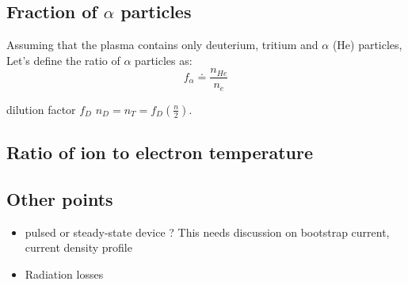 \subsection{Fraction of $\alpha$ particles}
Assuming that the plasma contains only deuterium, tritium and $\alpha$ (He) particles, 
Let's define the ratio of $\alpha$ particles as:
\begin{equation}
f_\alpha
\doteq
\frac{n_{He}}{n_e}
\end{equation}

dilution factor $f_D$ $n_D = n_T = f_D \left( \frac{n}{2} \right)$. 


\subsection{Ratio of ion to electron temperature}


\subsection{Other points}
\begin{itemize}
	\item pulsed or steady-state device ? This needs discussion on bootstrap current, current density profile
	\item Radiation losses
\end{itemize} 


